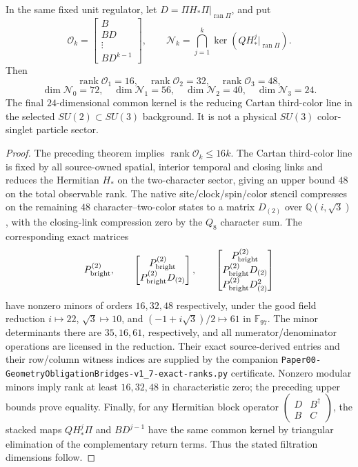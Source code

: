 \documentclass[12pt,a4paper]{article}
\begin{document}
\begin{theorem}
\label{p10:thm:v368-character-onset-filtration}
In the same fixed unit regulator, let
$D=\Pi H_*\Pi\vert_{\operatorname{ran}\Pi}$, and put
\[
\mathcal O_k=\begin{bmatrix}B\\BD\\\vdots\\BD^{k-1}\end{bmatrix},
\qquad
\mathcal N_k=\bigcap_{j=1}^{k}
\ker(QH_*^j\vert_{\operatorname{ran}\Pi}).
\]
Then
\[
\boxed{\operatorname{rank}\mathcal O_1=16,\quad
       \operatorname{rank}\mathcal O_2=32,\quad
       \operatorname{rank}\mathcal O_3=48,}
\]
\[
\boxed{\dim\mathcal N_0=72,\quad\dim\mathcal N_1=56,
\quad\dim\mathcal N_2=40,\quad\dim\mathcal N_3=24.}
\]
The final $24$-dimensional common kernel is the reducing Cartan
third-color line in the selected $SU(2)\subset SU(3)$ background.
It is not a physical $SU(3)$ color-singlet particle sector.
\end{theorem}
\begin{proof}
The preceding theorem implies $\operatorname{rank}\mathcal O_k\le16k$.
The Cartan third-color line is fixed by all source-owned spatial,
interior temporal and closing links and reduces the Hermitian
$H_*$ on the two-character sector, giving an upper bound $48$
on the total observable rank.
The native site/clock/spin/color stencil compresses on the remaining
$48$ character--two-color states to a matrix $D_{(2)}$ over
$\mathbb Q(i,\sqrt3)$, with the closing-link compression zero by
the $Q_8$ character sum.
The corresponding exact matrices
\[
P_{\rm bright}^{(2)},\qquad
\begin{bmatrix}P_{\rm bright}^{(2)}\\
P_{\rm bright}^{(2)}D_{(2)}\end{bmatrix},\qquad
\begin{bmatrix}P_{\rm bright}^{(2)}\\
P_{\rm bright}^{(2)}D_{(2)}\\
P_{\rm bright}^{(2)}D_{(2)}^2\end{bmatrix}
\]
have nonzero minors of orders $16,32,48$ respectively, under the
good field reduction
$i\mapsto22$, $\sqrt3\mapsto10$, and
$(-1+i\sqrt3)/2\mapsto61$ in $\mathbb F_{97}$.
The minor determinants there are $35,16,61$, respectively, and
all numerator/denominator operations are licensed in the reduction.
Their exact source-derived entries and their row/column witness
indices are supplied by the companion
\texttt{Paper00-GeometryObligationBridges-v1\_7-exact-ranks.py}
certificate. Nonzero modular minors imply rank at least $16,32,48$
in characteristic zero; the preceding upper bounds prove equality.
Finally, for any Hermitian block operator
$\left(\begin{smallmatrix}D&B^\dagger\\B&C\end{smallmatrix}\right)$,
the stacked maps $QH_*^j\Pi$ and $BD^{j-1}$ have the same common
kernel by triangular elimination of the complementary return terms.
Thus the stated filtration dimensions follow.
\end{proof}
\end{document}
